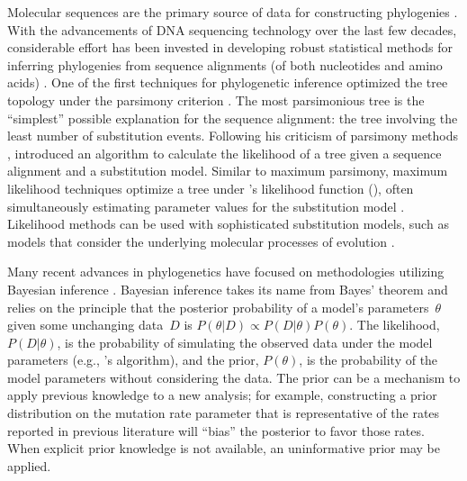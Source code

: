 \documentclass[12pt,letterpaper]{article}
\newcommand{\aposcite}[2]{\citeauthor{#1}'s #2 (\citeyear{#1})}
\begin{document}
Molecular sequences are the primary source of data for constructing phylogenies \parencite{Baum:2008}. With the advancements of DNA sequencing technology over the last few decades, considerable effort has been invested in developing robust statistical methods for inferring phylogenies from sequence alignments (of both nucleotides and amino acids) \parencite{Felsenstein:2005}. One of the first techniques for phylogenetic inference optimized the tree topology under the parsimony criterion \parencite{Fitch:1971}. The most parsimonious tree is the \enquote{simplest} possible explanation for the  sequence alignment: the tree involving the least number of substitution events. Following his criticism of parsimony methods \parencite{Felsenstein:1978}, \textcite{Felsenstein:1981} introduced an algorithm to calculate the likelihood of a tree given a sequence alignment and a substitution model. Similar to maximum parsimony, maximum likelihood techniques optimize a tree under \aposcite{Felsenstein:1981}{likelihood function}, often simultaneously estimating parameter values for the substitution model \parencite{Felsenstein:2005}. Likelihood methods can be used with sophisticated substitution models, such as models that consider the underlying molecular processes of evolution \parencite[e.g.,][]{Hasegawa:1985}.

Many recent advances in phylogenetics have focused on methodologies utilizing Bayesian inference \parencites{Ronquist:2012}{Drummond:2012}. Bayesian inference takes its name from Bayes' theorem \parencite{Bayes:1763} and relies on the principle that the posterior probability of a model's parameters~$\theta$ given some unchanging data~$D$ is $P\left(\theta|D\right) \propto P\left(D|\theta\right) P\left(\theta\right)$. The likelihood, $P\left(D|\theta\right)$, is the probability of simulating the observed data under the model parameters (e.g., \citeauthor{Felsenstein:1981}'s \citeyear{Felsenstein:1981} algorithm), and the prior, $P\left(\theta\right)$, is the probability of the model parameters without considering the data. The prior can be a mechanism to apply previous knowledge to a new analysis; for example, constructing a prior distribution on the mutation rate parameter that is representative of the rates reported in previous literature will \enquote{bias} the posterior to favor those rates. When explicit prior knowledge is not available, an uninformative prior may be applied.
\end{document}
